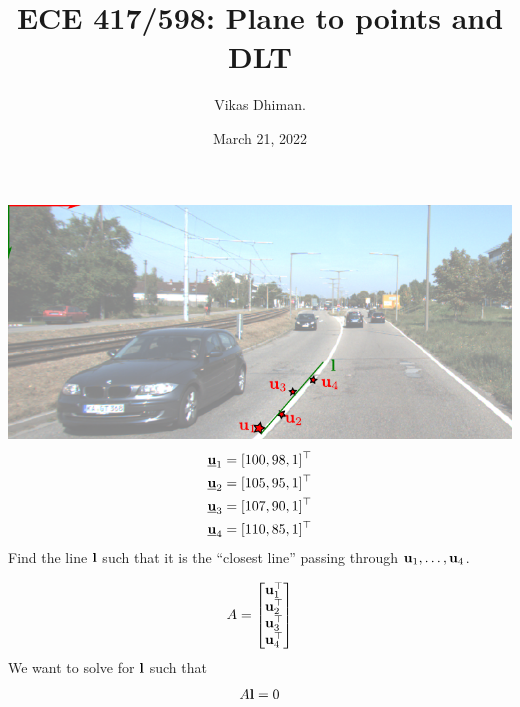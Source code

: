 \documentclass[times,t]{beamer}
\title{ECE 417/598: Plane to points and DLT}
\author{Vikas Dhiman.  }
\date{March 21, 2022}
\begin{document}
\newcommand{\ubfu}{\underline{\bfu}}
\begin{frame}
  \titlepage
  \end{frame}
\begin{frame}
  \includegraphics[width=\linewidth]{media/lane-from-points.pdf}
  \begin{align*}
    \ubfu_1 &= [100, 98, 1]^\top\\
    \ubfu_2 &= [105, 95, 1]^\top\\
    \ubfu_3 &= [107, 90, 1]^\top\\
    \ubfu_4 &= [110, 85, 1]^\top
    \end{align*}
    Find  the line $\mathbf{l}$ such that it is the ``closest line'' passing through
    $\mathbf{u}_1, \dots, \mathbf{u}_4$.
\end{frame}

\begin{frame}
  \begin{align*}
  A = \begin{bmatrix}\mathbf{u}_1^\top  \\
    \mathbf{u}_2^\top \\
    \mathbf{u}_3^\top \\
    \mathbf{u}_4^\top
  \end{bmatrix}
  \end{align*}
  We want to solve for $\mathbf{l}$ such that
  \begin{align*}
    A \mathbf{l} = 0
  \end{align*}
\end{frame}
\end{document}

